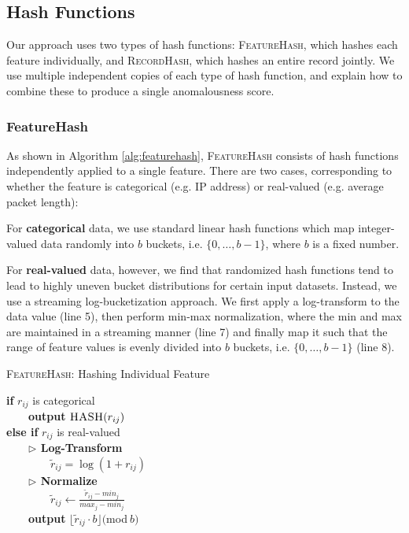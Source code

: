 \documentclass[sigconf]{acmart}
\begin{document}
\subsection{Hash Functions}
\label{sec:hashfunc}

Our approach uses two types of hash functions: \textsc{FeatureHash}, which hashes each feature individually, and \textsc{RecordHash}, which hashes an entire record jointly. We use multiple independent copies of each type of hash function, and explain how to combine these to produce a single anomalousness score.

\subsubsection{FeatureHash}
\label{sec:feature}

As shown in Algorithm \ref{alg:featurehash}, \textsc{FeatureHash} consists of hash functions independently applied to a single feature. There are two cases, corresponding to whether the feature is categorical (e.g. IP address) or real-valued (e.g. average packet length):

For \textbf{categorical} data, we use standard linear hash functions \cite{litwin1980linear} which map integer-valued data randomly into $b$ buckets, i.e. $\{0, \dots, b-1\}$, where $b$ is a fixed number.


For \textbf{real-valued} data, however, we find that randomized hash functions tend to lead to highly uneven bucket distributions for certain input datasets. Instead, we use a streaming log-bucketization approach. We first apply a log-transform to the data value (line 5), then perform min-max normalization, where the min and max are maintained in a streaming manner (line 7) and finally map it such that the range of feature values is evenly divided into $b$ buckets, i.e. $\{0, \dots, b-1\}$ (line 8). 
    
\begin{algorithm}
	\caption{\textsc{FeatureHash}: Hashing Individual Feature  \label{alg:featurehash}}
	\textbf{if} $r_{ij}$ is categorical  \\
	\ \ \ \ \textbf{output} $\Call{HASH}{r_{ij}}$  \\
	\textbf{else if} $r_{ij}$ is real-valued  \\
	\ \ \ \ {\bf $\triangleright$ Log-Transform} \\
	\ \ \ \ \ \ \ \ $\tilde{r}_{ij} = \log(1+r_{ij})$ \\
	\ \ \ \ {\bf $\triangleright$ Normalize} \\
	\ \ \ \ \ \ \ \ $\tilde{r}_{ij} \gets \frac{\tilde{r}_{ij} - min_{j}}{max_{j} - min_{j}}$  \\
    \ \ \ \ {\bf output} $\lfloor \tilde{r}_{ij} \cdot b \rfloor  ($mod$ \ b)$  \\
\end{algorithm}
\end{document}
